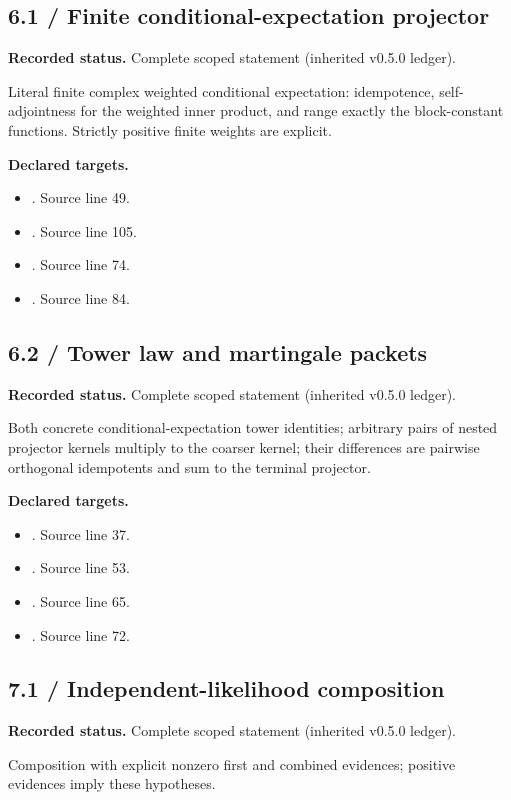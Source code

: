 \subsection{6.1 / Finite conditional-expectation projector}
\label{result:6.1}
\textbf{Recorded status.} Complete scoped statement (inherited v0.5.0 ledger).\par
Literal finite complex weighted conditional expectation: idempotence, self-adjointness for the weighted inner product, and range exactly the block-constant functions. Strictly positive finite weights are explicit.

\textbf{Declared targets.}\begin{itemize}
\item {}. Source line 49.
\item {}. Source line 105.
\item {}. Source line 74.
\item {}. Source line 84.
\end{itemize}
\subsection{6.2 / Tower law and martingale packets}
\label{result:6.2}
\textbf{Recorded status.} Complete scoped statement (inherited v0.5.0 ledger).\par
Both concrete conditional-expectation tower identities; arbitrary pairs of nested projector kernels multiply to the coarser kernel; their differences are pairwise orthogonal idempotents and sum to the terminal projector.

\textbf{Declared targets.}\begin{itemize}
\item {}. Source line 37.
\item {}. Source line 53.
\item {}. Source line 65.
\item {}. Source line 72.
\end{itemize}
\subsection{7.1 / Independent-likelihood composition}
\label{result:7.1}
\textbf{Recorded status.} Complete scoped statement (inherited v0.5.0 ledger).\par
Composition with explicit nonzero first and combined evidences; positive evidences imply these hypotheses.

